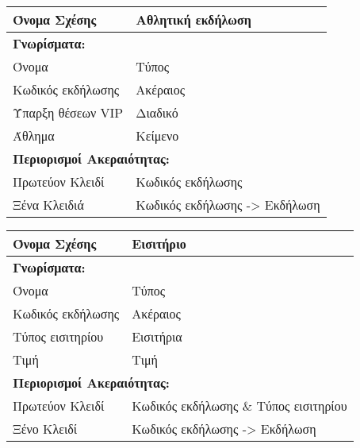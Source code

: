\begin{tabular}{|p{6cm}|p{8cm}|}
  \hline
  Όνομα Σχέσης      & Αθλητική εκδήλωση                    \\ \hline
  \multicolumn{2}{|l|}{\textbf{Γνωρίσματα:}}               \\ \hline
  Όνομα             & Τύπος                                \\ \hline
  Κωδικός εκδήλωσης & Ακέραιος                             \\ \hline
  Ύπαρξη θέσεων VIP & Διαδικό                              \\ \hline
  Άθλημα            & Κείμενο                              \\ \hline
  \multicolumn{2}{|l|}{\textbf{Περιορισμοί Ακεραιότητας:}} \\ \hline
  Πρωτεύον Κλειδί   & Κωδικός εκδήλωσης                    \\ \hline
  Ξένα Κλειδιά      & Κωδικός εκδήλωσης -> Εκδήλωση        \\ \hline
\end{tabular}

\begin{tabular}{|p{6cm}|p{8cm}|}
  \hline
  Όνομα Σχέσης      & Εισιτήριο                             \\ \hline
  \multicolumn{2}{|l|}{\textbf{Γνωρίσματα:}}                \\ \hline
  Όνομα             & Τύπος                                 \\ \hline
  Κωδικός εκδήλωσης & Ακέραιος                              \\ \hline
  Τύπος εισιτηρίου  & Εισιτήρια                             \\ \hline
  Τιμή              & Τιμή                                  \\ \hline
  \multicolumn{2}{|l|}{\textbf{Περιορισμοί Ακεραιότητας:}}  \\ \hline
  Πρωτεύον Κλειδί   & Κωδικός εκδήλωσης \& Τύπος εισιτηρίου \\ \hline
  Ξένο Κλειδί       & Κωδικός εκδήλωσης -> Εκδήλωση         \\ \hline
\end{tabular}



